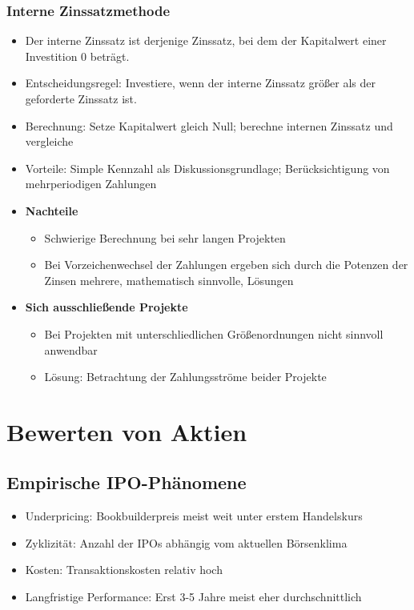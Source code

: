 \subsubsection{Interne Zinssatzmethode}
\begin{itemize}
	\item Der interne Zinssatz ist derjenige Zinssatz, bei dem der Kapitalwert einer Investition 0 beträgt.
	\item Entscheidungsregel: Investiere, wenn der interne Zinssatz größer als der geforderte Zinssatz ist.
	\item Berechnung: Setze Kapitalwert gleich Null; berechne internen Zinssatz und vergleiche
	\item Vorteile: Simple Kennzahl als Diskussionsgrundlage; Berücksichtigung von mehrperiodigen Zahlungen
	\item \textbf{Nachteile}
	\begin{itemize}
		\item Schwierige Berechnung bei sehr langen Projekten
		\item Bei Vorzeichenwechsel der Zahlungen ergeben sich durch die Potenzen der Zinsen mehrere, mathematisch sinnvolle, Lösungen
	\end{itemize}
	\item \textbf{Sich ausschließende Projekte}
	\begin{itemize}
		\item Bei Projekten mit unterschliedlichen Größenordnungen nicht sinnvoll anwendbar
		\item Lösung: Betrachtung der Zahlungsströme beider Projekte
	\end{itemize}
\end{itemize}



\section{Bewerten von Aktien}

\subsection{Empirische IPO-Phänomene}
\begin{itemize}
	\item Underpricing: Bookbuilderpreis meist weit unter erstem Handelskurs
	\item Zyklizität: Anzahl der IPOs abhängig vom aktuellen Börsenklima
	\item Kosten: Transaktionskosten relativ hoch
	\item Langfristige Performance: Erst 3-5 Jahre meist eher durchschnittlich
\end{itemize}


